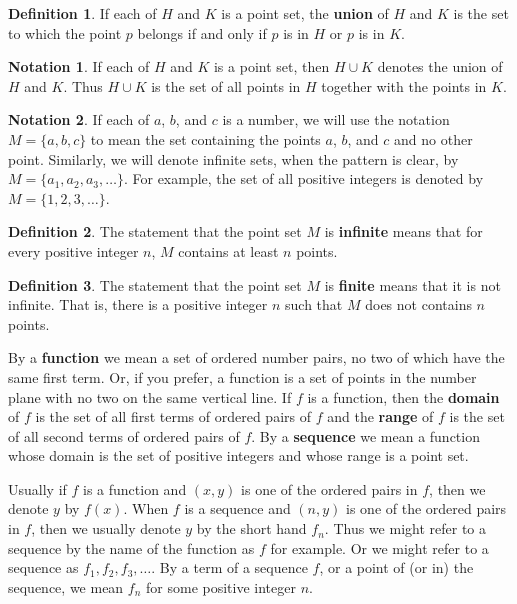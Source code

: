 \documentclass{article}
\theoremstyle{definition}
\newtheorem{definition}{Definition}
\newtheorem{notation}{Notation}
\begin{document}
\begin{definition}
If each of $H$ and $K$ is a point set, the \textbf{union} of $H$ and $K$ is the set to which the point $p$ belongs if and only if $p$ is in $H$ or $p$ is in $K$.
\end{definition}
\begin{notation}
If each of $H$ and $K$ is a point set, then $H \cup K$ denotes the union of $H$ and $K$. Thus $H \cup K$ is the set of all points in $H$ together with the points in $K$.
\end{notation}

\begin{notation}
If each of $a$, $b$, and $c$ is a number, we will use the notation $M = \{a, b, c\}$ to mean the set containing the points $a$, $b$, and $c$ and no other point. Similarly, we will denote infinite sets, when the pattern is clear, by $M = \{a_1, a_2, a_3, \dots\}$. For example, the set of all positive integers is denoted by $M = \{1, 2, 3, \dots\}$.
\end{notation}

\begin{definition}
The statement that the point set $M$ is \textbf{infinite} means that for every positive integer $n$, $M$ contains at least $n$ points.
\end{definition}

\begin{definition}
The statement that the point set $M$ is \textbf{finite} means that it is not infinite. That is, there is a positive integer $n$ such that $M$ does not contains $n$ points.
\end{definition}

By a \textbf{function} we mean a set of ordered number pairs, no two of which have the same first term. Or, if you prefer, a function is a set of points in the number plane with no two on the same vertical line. If $f$ is a function, then the \textbf{domain} of $f$ is the set of all first terms of ordered pairs of $f$ and the \textbf{range} of $f$ is the set of all second terms of ordered pairs of $f$. By a \textbf{sequence} we mean a function whose domain is the set of positive integers and whose range is a point set.

Usually if $f$ is a function and $(x, y)$ is one of the ordered pairs in $f$, then we denote $y$ by $f(x)$. When $f$ is a sequence and $(n, y)$ is one of the ordered pairs in $f$, then we usually denote $y$ by the short hand $f_n$. Thus we might refer to a sequence by the name of the function as $f$ for example. Or we might refer to a sequence as $f_1, f_2, f_3, \dots$. By a term of a sequence $f$, or a point of (or in) the sequence, we mean $f_n$ for some positive integer $n$.
\end{document}
